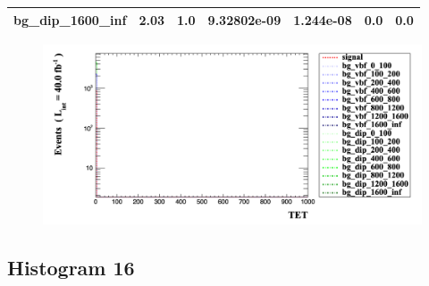 \documentclass[a4paper, 10pt]{article}
\begin{document}
\begin{table}[H]
\begin{center}
\begin{tabular}{|m{23.0mm}|m{23.0mm}|m{18.0mm}|m{19.0mm}|m{19.0mm}|m{19.0mm}|m{19.0mm}|}
      \hline
      {\cellcolor{white}         bg\_dip\_1600\_inf}& {\cellcolor{white}         2.03}& {\cellcolor{white}         1.0}& {\cellcolor{white}         9.32802e-09}& {\cellcolor{white}         1.244e-08}& {\cellcolor{green}         0.0}& {\cellcolor{green}         0.0}\\
\hline
    \end{tabular}
  \end{center}
\end{table}

\begin{figure}[H]
  \begin{center}
    \includegraphics[scale=0.45]{selection_14.png}\\
\caption{   }
  \end{center}
\end{figure}
      \newpage
\subsection{ Histogram 16}
\end{document}
